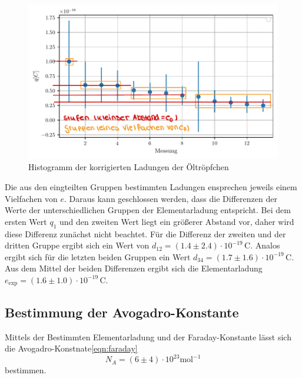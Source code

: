 \begin{figure}[H]
    \centering
    \includegraphics[width=0.75\linewidth]{content/grafik/plot1-korr.pdf}
    \caption{Histogramm der korrigierten Ladungen der Öltröpfchen}
    \label{fig:plotkorr}
\end{figure}

Die aus den eingteilten Gruppen bestimmten Ladungen ensprechen jeweils einem Vielfachen von $e$. Daraus kann geschlossen werden,
dass die Differenzen der Werte der unterschiedlichen Gruppen der Elementarladung entspricht. Bei dem ersten Wert $q_1$ und den zweiten
Wert liegt ein größerer Abstand vor, daher wird diese Differenz zunächst nicht beachtet.
Für die Differenz der zweiten und der dritten Gruppe ergibt sich ein Wert von $d_12 = (1.4 \pm 2.4) \cdot 10^{-19} \, \mathrm{C}$. Analos ergibt sich für die
letzten beiden Gruppen ein Wert $d_34 = (1.7 \pm 1.6) \cdot 10^{-19} \, \mathrm{C}$. 
Aus dem Mittel der beiden Differenzen ergibt sich die Elementarladung $e_{\text{exp}} = (1.6 \pm 1.0) \cdot 10^{-19} \, \mathrm{C}$.

\subsection{Bestimmung der Avogadro-Konstante}
\label{sec:bestimmung der Avogadro-konstante}

Mittels der Bestimmten Elementarladung und der Faraday-Konstante lässt sich die Avogadro-Konstnate\eqref{eqn:faraday}
\begin{equation*} 
	N_{\! A} = (6 \pm 4) \cdot 10^{23} \mathrm{mol}^{-1}
\end{equation*}
bestimmen.
